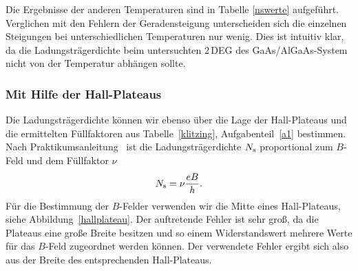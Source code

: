 \documentclass[paper=a4,fontsize=10pt,DIV=18,twocolumn,parskip=half]{scrartcl}
\numberwithin{equation}{section}    %
\newcommand{\kor}[1]{{\color{darkgreen}#1}}
\begin{document}
Die Ergebnisse der anderen Temperaturen sind in Tabelle \ref{nswerte} aufgeführt.
Verglichen mit den Fehlern der Geradensteigung unterscheiden sich die einzelnen Steigungen bei unterschiedlichen Temperaturen nur wenig. Dies ist intuitiv klar, da die Ladungsträgerdichte beim untersuchten 2\,DEG des GaAs/AlGaAs-System nicht von der Temperatur abhängen sollte.

\subsubsection*{Mit Hilfe der Hall-Plateaus}
Die Ladungsträgerdichte können wir ebenso über die Lage der Hall-Plateaus und die ermittelten Füllfaktoren aus Tabelle~\ref{klitzing}, Aufgabenteil~\ref{a1} bestimmen. Nach Praktikumsanleitung~\citep{anleitung} ist die Ladungsträgerdichte $N_{\rm s}$ proportional zum $B$-Feld und dem Füllfaktor $\nu$
\begin{equation}
	N_{\rm s} = \nu\frac{e B}{h}.
	\label{eq.Ns}
\end{equation}
\kor{Für die Bestimmung der $B$-Felder verwenden wir die Mitte eines Hall-Plateaus, siehe Abbildung~\ref{hallplateau}. Der auftretende Fehler ist sehr groß, da die Plateaus eine große Breite besitzen und so einem Widerstandswert mehrere Werte für das $B$-Feld zugeordnet werden können. Der verwendete Fehler ergibt sich also aus der Breite des entsprechenden Hall-Plateaus.}
\end{document}
